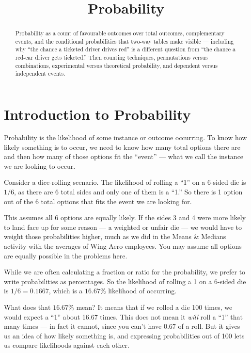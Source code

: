 \documentclass[12pt]{ximera}
\title{Probability}
\begin{document}
\begin{abstract}
Probability as a count of favourable outcomes over total outcomes, complementary
events, and the conditional probabilities that two-way tables make visible --- including
why ``the chance a ticketed driver drives red'' is a different question from ``the chance
a red-car driver gets ticketed.'' Then counting techniques, permutations versus
combinations, experimental versus theoretical probability, and dependent versus
independent events.
\end{abstract}
\maketitle

\section*{Introduction to Probability}

Probability is the likelihood of some instance or outcome occurring. To know how likely
something is to occur, we need to know how many total options there are and then how
many of those options fit the ``event'' --- what we call the instance we are looking to
occur.

Consider a dice-rolling scenario. The likelihood of rolling a ``1'' on a 6-sided die is
$1/6$, as there are 6 total sides and only one of them is a ``1.'' So there is 1 option
out of the 6 total options that fits the event we are looking for.

This assumes all 6 options are equally likely. If the sides 3 and 4 were more likely to
land face up for some reason --- a weighted or unfair die --- we would have to weight
those probabilities higher, much as we did in the Means \& Medians activity with the
averages of Wing Aero employees. You may assume all options are equally possible in the
problems here.

While we are often calculating a fraction or ratio for the probability, we prefer to
write probabilities as percentages. So the likelihood of rolling a 1 on a 6-sided die is
$1/6 = 0.1667$, which is a $16.67\%$ likelihood of occurring.

What does that $16.67\%$ mean? It means that if we rolled a die 100 times, we would
expect a ``1'' about 16.67 times. This does not mean it \emph{will} roll a ``1'' that
many times --- in fact it cannot, since you can't have $0.67$ of a roll. But it gives us
an idea of how likely something is, and expressing probabilities out of 100 lets us
compare likelihoods against each other.
\end{document}
